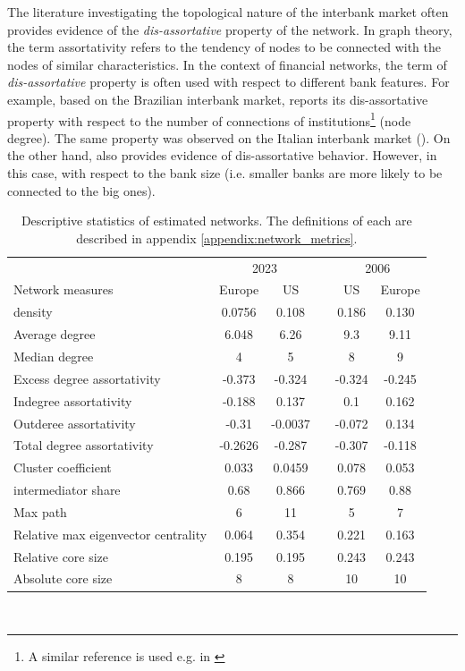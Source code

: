 \documentclass[12pt]{article}
\begin{document}
The literature investigating the topological nature of the interbank market often provides evidence of the \textit{dis-assortative} property of the network. In graph theory, the term assortativity refers to the tendency of nodes to be connected with the nodes of similar characteristics. In the context of financial networks, the term of \textit{dis-assortative} property is often used with respect to different bank features. For example, based on the Brazilian interbank market, \cite{silva16} reports its dis-assortative property with respect to the number of connections of institutions\footnote{A similar reference is used e.g. in \cite{aldasoro17}} (node degree). The same property was observed on the Italian interbank market (\cite{bargigli15}). On the other hand, \cite{craig14} also provides evidence of dis-assortative behavior. However, in this case, with respect to the bank size (i.e. smaller banks are more likely to be connected to the big ones).

\begin{table}
	\center
	\begin{tabular}{lcc c cc}
		\hline
		& \multicolumn{2}{c}{2023} & & \multicolumn{2}{c}{2006}\\
		\cline{2-3} \cline{5-6} 
		\multicolumn{1}{l}{Network measures} & \multicolumn{1}{c}{Europe} & \multicolumn{1}{c}{US} && \multicolumn{1}{c}{US} & \multicolumn{1}{c}{Europe}\\
		\hline
		density & 0.0756 & 0.108 && 0.186 & 0.130 \\
		Average degree & 6.048 & 6.26 && 9.3 & 9.11 \\
		Median degree & 4 & 5 && 8 & 9 \\
		Excess degree assortativity & -0.373 & -0.324 && -0.324 & -0.245 \\
		Indegree assortativity & -0.188 & 0.137 && 0.1 & 0.162 \\
		Outderee assortativity & -0.31 & -0.0037 && -0.072 & 0.134 \\    
		Total degree assortativity & -0.2626 & -0.287 && -0.307 & -0.118 \\
		Cluster coefficient & 0.033 & 0.0459 && 0.078 & 0.053 \\
		intermediator share & 0.68 & 0.866 && 0.769 & 0.88 \\   
		Max path & 6 & 11 && 5 & 7 \\
		Relative max eigenvector centrality & 0.064 &  0.354 &&     0.221 & 0.163 \\
		Relative core size & 0.195 & 0.195 && 0.243 & 0.243 \\
		Absolute core size & 8 & 8 && 10 & 10 \\
		\hline
	\end{tabular}\
	\caption{Descriptive statistics of estimated networks. The definitions of each are described in appendix \ref{appendix:network_metrics}.}
	\label{table:network_metrics}
\end{table}
\end{document}
